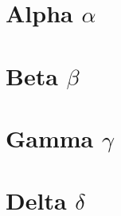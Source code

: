 \apendice
\chapter{Alpha $\alpha$}
\chapter{Beta $\beta$}


\anexo
\chapter{Gamma $\gamma$}
\chapter{Delta $\delta$}
